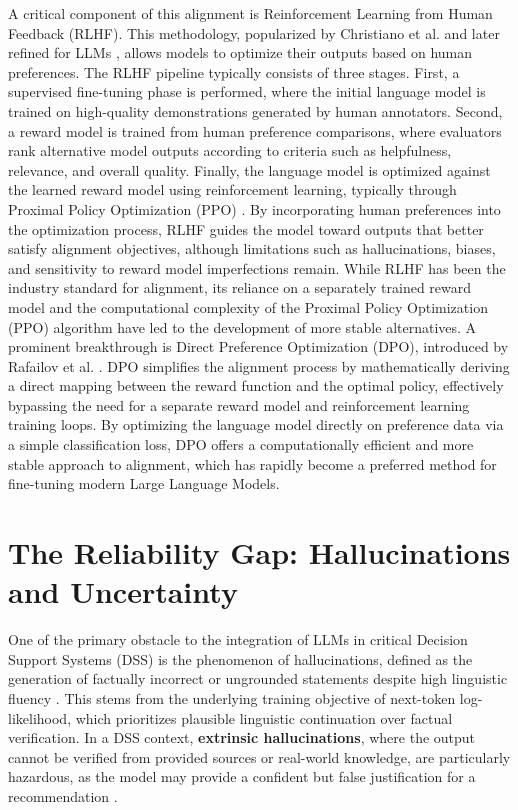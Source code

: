 A critical component of this alignment is Reinforcement Learning from Human Feedback (RLHF). This methodology, popularized by Christiano et al. \cite{christiano2017deep} and later refined for LLMs \cite{stiennon2020learning}, allows models to optimize their outputs based on human preferences. 
The RLHF pipeline typically consists of three stages. First, a supervised fine-tuning phase is performed, where the initial language model is trained on high-quality demonstrations generated by human annotators. Second, a reward model is trained from human preference comparisons, where evaluators rank alternative model outputs according to criteria such as helpfulness, relevance, and overall quality. Finally, the language model is optimized against the learned reward model using reinforcement learning, typically through Proximal Policy Optimization (PPO) \cite{schulman2017proximal}. By incorporating human preferences into the optimization process, RLHF guides the model toward outputs that better satisfy alignment objectives, although limitations such as hallucinations, biases, and sensitivity to reward model imperfections remain. 
While RLHF has been the industry standard for alignment, its reliance on a separately trained reward model and the computational complexity of the Proximal Policy Optimization (PPO) algorithm have led to the development of more stable alternatives. A prominent breakthrough is Direct Preference Optimization (DPO), introduced by Rafailov et al. \cite{rafailov2023direct}. DPO simplifies the alignment process by mathematically deriving a direct mapping between the reward function and the optimal policy, effectively bypassing the need for a separate reward model and reinforcement learning training loops. By optimizing the language model directly on preference data via a simple classification loss, DPO offers a computationally efficient and more stable approach to alignment, which has rapidly become a preferred method for fine-tuning modern Large Language Models.

\section{The Reliability Gap: Hallucinations and Uncertainty}
One of the primary obstacle to the integration of LLMs in critical Decision Support Systems (DSS) is the phenomenon of hallucinations, defined as the generation of factually incorrect or ungrounded statements despite high linguistic fluency \cite{ji2023survey}. 
This stems from the underlying training objective of next-token log-likelihood, which prioritizes plausible linguistic continuation over factual verification. In a DSS context, \textbf{extrinsic hallucinations}, where the output cannot be verified from provided sources or real-world knowledge, are particularly hazardous, as the model may provide a confident but false justification for a recommendation \cite{Survey2025}.

